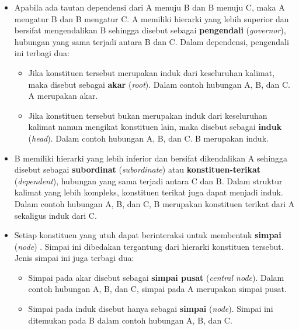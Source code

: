 \begin{itemize}
\item Apabila ada tautan dependensi dari A menuju B dan B menuju C, maka A mengatur B dan B mengatur C. A memiliki hierarki yang lebih superior dan bersifat mengendalikan B sehingga disebut sebagai \textbf{pengendali} (\textit{governor}), hubungan yang sama terjadi antara B dan C. Dalam dependensi, pengendali ini terbagi dua:
\begin{itemize} 
\item Jika konstituen tersebut merupakan induk dari keseluruhan kalimat, maka disebut sebagai \textbf{\gls{akar}} (\textit{root}). Dalam contoh hubungan A, B, dan C. A merupakan akar.
\item Jika konstituen tersebut bukan merupakan induk dari keseluruhan kalimat namun mengikat konstituen lain, maka disebut sebagai \textbf{\gls{induk}} (\textit{head}). Dalam contoh hubungan A, B, dan C. B merupakan induk.
\end{itemize}
\item B memiliki hierarki yang lebih inferior dan bersifat dikendalikan A sehingga disebut sebagai \textbf{subordinat} (\textit{subordinate}) atau \textbf{\gls{konstituen-terikat}} (\textit{dependent}), hubungan yang sama terjadi antara C dan B. Dalam struktur kalimat yang lebih kompleks, konstituen terikat juga dapat menjadi induk. Dalam contoh hubungan A, B, dan C, B merupakan konstituen terikat dari A sekaligus induk dari C.
\item Setiap konstituen yang utuh dapat berinteraksi untuk membentuk \textbf{simpai} (\textit{node}) \citep{tesniere1959elements}. Simpai ini dibedakan tergantung dari hierarki konstituen tersebut. Jenis simpai ini juga terbagi dua:
\begin{itemize}
\item Simpai pada akar disebut sebagai \textbf{simpai pusat} (\textit{central node}). Dalam contoh hubungan A, B, dan C, simpai pada A merupakan simpai pusat.
\item Simpai pada induk disebut hanya sebagai \textbf{simpai} (\textit{node}). Simpai ini ditemukan pada B dalam contoh hubungan A, B, dan C.
\end{itemize}
\end{itemize}

